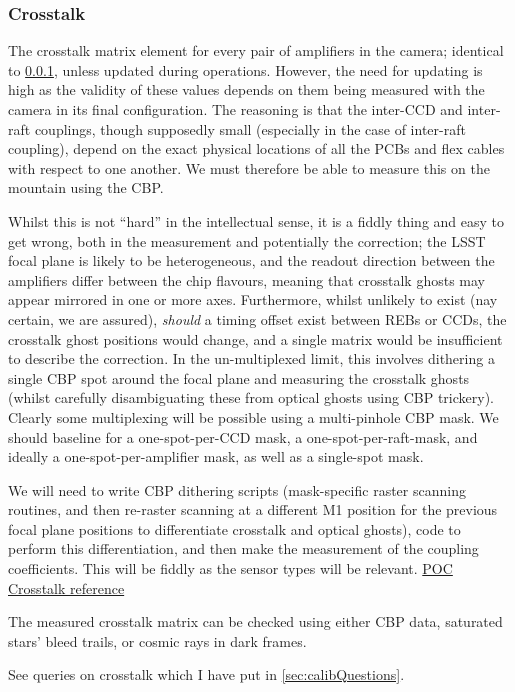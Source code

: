 \subsubsection{Crosstalk}\label{sec:CPP:output:crosstalk}
The crosstalk matrix element for every pair of amplifiers in the camera; identical to \secsymbol\ref{sec:CPP:output:crosstalk}, unless updated during operations. However, the need for updating is high as the validity of these values depends on them being measured with the camera in its final configuration. The reasoning is that the inter-CCD and inter-raft couplings, though supposedly small (especially in the case of inter-raft coupling), depend on the exact physical locations of all the PCBs and flex cables with respect to one another. We must therefore be able to measure this on the mountain using the CBP.

Whilst this is not ``hard'' in the intellectual sense, it is a fiddly thing and easy to get wrong, both in the measurement and potentially the correction; the LSST focal plane is likely to be heterogeneous, and the readout direction between the amplifiers differ between the chip flavours, meaning that crosstalk ghosts may appear mirrored in one or more axes. Furthermore, whilst unlikely to exist (nay certain, we are assured), \emph{should} a timing offset exist between REBs or CCDs, the crosstalk ghost positions would change, and a single matrix would be insufficient to describe the correction.
\alg In the un-multiplexed limit, this involves dithering a single CBP spot around the focal plane and measuring the crosstalk ghosts (whilst carefully disambiguating these from optical ghosts using CBP trickery). Clearly some multiplexing will be possible using a multi-pinhole CBP mask. We should baseline for a one-spot-per-CCD mask, a one-spot-per-raft-mask, and ideally a one-spot-per-amplifier mask, as well as a single-spot mask.

We will need to write CBP dithering scripts (mask-specific raster scanning routines, and then re-raster scanning at a different M1 position for the previous focal plane positions to differentiate crosstalk and optical ghosts), code to perform this differentiation, and then make the measurement of the coupling coefficients. This will be fiddly as the sensor types will be relevant. \hyperref{http://iopscience.iop.org/article/10.1088/1748-0221/10/05/C05010}{}{}{POC Crosstalk reference} 

The measured crosstalk matrix can be checked using either CBP data, saturated stars' bleed trails, or cosmic rays in dark frames.
\begin{note}
	See queries on crosstalk which I have put in \secsymbol\ref{sec:calibQuestions}.
\end{note}



